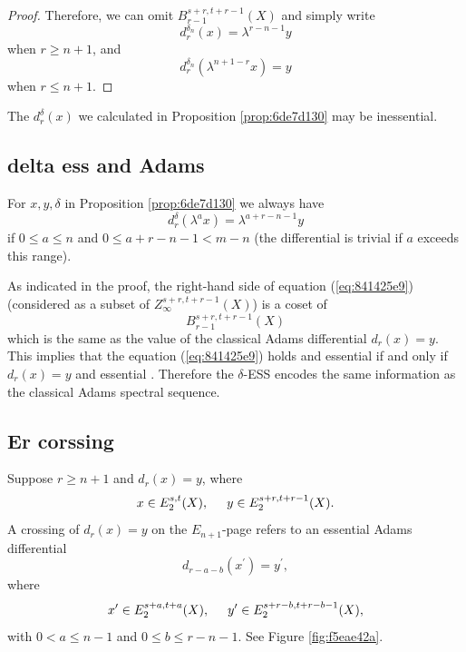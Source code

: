 \documentclass[12pt]{amsart}
\numberwithin{equation}{section}
\begin{document}
\begin{proof}
    Therefore, we can omit $B_{r-1}^{s+r,t+r-1}(X)$ and simply write
    $$d^{\delta_n}_r(x)= \lambda^{r-n-1}y$$
    when $r\ge n+1$, and
    $$d^{\delta_n}_r(\lambda^{n+1-r}x)= y$$
    when $r\le n+1$.
\end{proof}

\begin{remark}
    The $d^{\delta}_r(x)$ we calculated in Proposition \ref{prop:6de7d130} may be inessential.
\end{remark}

\subsection{delta ess and Adams}
\begin{corollary}\label{cor:2a636737}
    For $x,y,\delta$ in Proposition \ref{prop:6de7d130} we always have
    \begin{equation}\label{eq:841425e9}
        d^{\delta}_r(\lambda^ax)=\lambda^{a+r-n-1}y
    \end{equation}
    if $0\le a\le n$ and $0\le a+r-n-1<m-n$ (the differential is trivial if $a$ exceeds this range).
\end{corollary}

\begin{remark}\label{rmk:qvoewfj}
    As indicated in the proof, the right-hand side of equation (\ref{eq:841425e9}) (considered as a subset of $Z_\infty^{s+r,t+r-1}(X)$) is a coset of
    $$B_{r-1}^{s+r,t+r-1}(X)$$
    which is the same as the value of the classical Adams differential $d_r(x)=y$. This implies that the equation (\ref{eq:841425e9}) holds and essential if and only if $d_r(x)=y$ and essential . Therefore the $\delta$-ESS encodes the same information as the classical Adams spectral sequence.
\end{remark}

\subsection{Er corssing}
\begin{definition} \label{def:classicalcrossdiff}
    Suppose $r\ge n+1$ and $d_r(x)=y$, where
    $$x\in E_2^{s,t}(X), \hspace{0.5cm} y\in E_2^{s+r,t+r-1}(X).$$
    A crossing of $d_r(x)=y$ on the $E_{n+1}$-page refers to an essential Adams differential
    $$d_{r-a-b}(x^\prime)=y^\prime,$$
    where
    $$x^\prime\in E_2^{s+a,t+a}(X), \hspace{.5cm} y^\prime\in E_2^{s+r-b,t+r-b-1}(X),$$
    with $0<a\le n-1$ and $0\le b\le r-n-1$. See Figure \ref{fig:f5eae42a}.
\end{definition}
\end{document}
